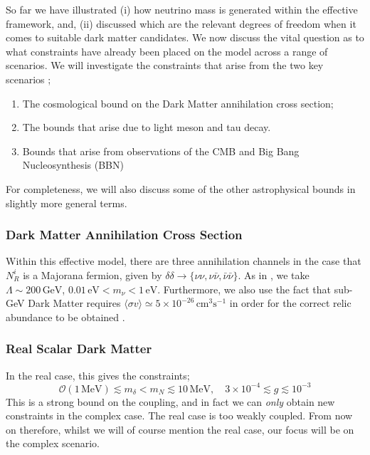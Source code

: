 So far we have illustrated (i) how neutrino mass is generated within the effective framework, and, (ii) discussed which are the relevant degrees of freedom when it comes to suitable dark matter candidates. We now discuss the vital question as to what constraints have already been placed on the model across a range of scenarios. We will investigate the constraints that arise from the two key scenarios \cite{Boehm2006, Franarin2018, Farzan2009, Farzan2011, Farzan2014, Farzan2010};
\begin{enumerate}
  \item The cosmological bound on the Dark Matter annihilation cross section;
  \item The bounds that arise due to light meson and tau decay.
  \item Bounds that arise from observations of the CMB and Big Bang Nucleosynthesis (BBN)
\end{enumerate}
For completeness, we will also discuss some of the other astrophysical bounds in slightly more general terms.
\subsubsection{Dark Matter Annihilation Cross Section}
Within this effective model, there are three annihilation channels in the case that $N^i_R$ is a Majorana fermion, given by $\delta \delta \rightarrow \{\nu\nu, \nu\bar{\nu}, \bar{\nu}\bar{\nu}\}$. As in \cite{Boehm2006}, we take $\Lambda \sim 200 \, \text{GeV}$, $0.01 \, \text{eV} < m_\nu < 1\, \text{eV}$. Furthermore, we also use the fact that sub-GeV Dark Matter requires $\langle \sigma v \rangle \simeq 5 \times 10^{-26}\, \text{cm}^3\text{s}^{-1}$ in order for the correct relic abundance to be obtained \cite{Steigman2012}.

\vspace{-0.3cm}

\subsubsection*{Real Scalar Dark Matter}
In the real case, this gives the constraints;
\begin{equation}
  \mathcal{O}(1 \, \text{MeV}) \lesssim m_\delta < m_N \lesssim 10 \, \text{MeV}, \quad 3 \times 10^{-4} \lesssim g \lesssim 10^{-3}
\end{equation}
\noindent This is a strong bound on the coupling, and in fact we can \emph{only} obtain new constraints in the complex case. The real case is too weakly coupled. From now on therefore, whilst we will of course mention the real case, our focus will be on the complex scenario.

